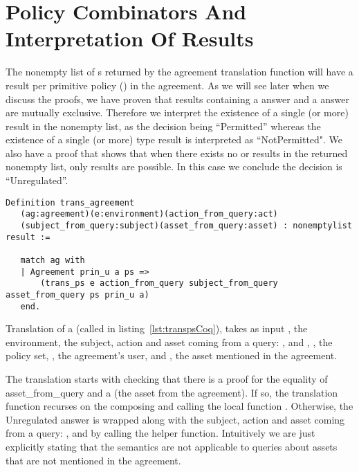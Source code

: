 \section{Policy Combinators And Interpretation Of Results}\label{sec:policycombinators}

The nonempty list of s returned by the agreement translation function will have a result per primitive policy () in the agreement. As we will see later when we discuss the proofs, we have proven that results containing a  answer and a  answer are mutually exclusive. Therefore we interpret the existence of a single (or more)  result in the nonempty list, as the decision being ``Permitted'' whereas the existence of a single (or more)  type result is interpreted as ``NotPermitted". We also have a proof that shows that when there exists no  or  results in the returned nonempty list, only  results are possible. In this case we conclude the decision is ``Unregulated''. 

\begin{lstlisting}
Definition trans_agreement
   (ag:agreement)(e:environment)(action_from_query:act)
   (subject_from_query:subject)(asset_from_query:asset) : nonemptylist result :=

   match ag with
   | Agreement prin_u a ps => 
       (trans_ps e action_from_query subject_from_query asset_from_query ps prin_u a)
   end.
\end{lstlisting}

Translation of a  (called  in listing~\ref{lst:transpsCoq}), takes as input , the environment, the subject, action and asset coming from a query: ,  and , , the policy set, , the agreement's user, and , the asset mentioned in the agreement. 

The translation starts with checking that there is a proof for the equality of asset_from_query and a (the asset from the agreement). If so, the translation function recurses on the composing  and calling the local function . Otherwise, the Unregulated answer is wrapped along with the subject, action and asset coming from a query: ,  and  by calling the  helper function. Intuitively we are just explicitly stating that the semantics are not applicable to queries about assets that are not mentioned in the agreement. 

